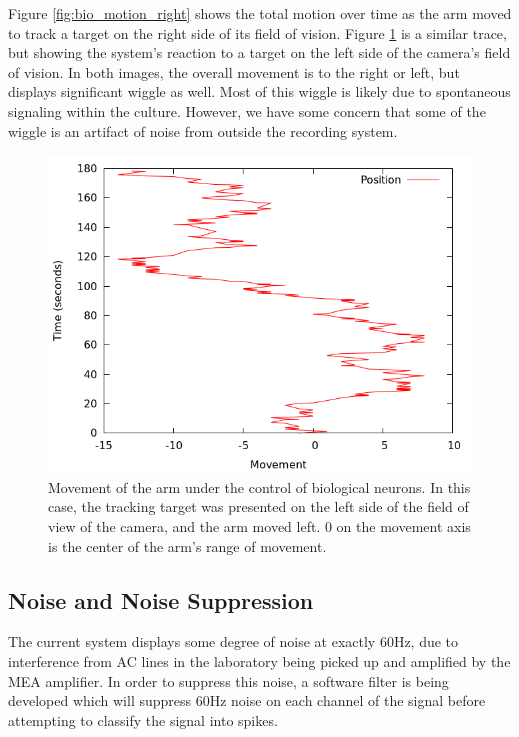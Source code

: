 \documentclass[letterpaper]{article}
\begin{document}
Figure \ref{fig:bio_motion_right} shows the total motion over time as the arm moved to track a target on the right side of its field of vision. 
Figure \ref{fig:bio_motion_left} is a similar trace, but showing the system's reaction to a target on the left side of the camera's field of vision. 
In both images, the overall movement is to the right or left, but displays significant wiggle as well.
Most of this wiggle is likely due to spontaneous signaling within the culture.
However, we have some concern that some of the wiggle is an artifact of noise from outside the recording system. 

\begin{figure}
	\centering
	\includegraphics[width=\linewidth]{bio_motion_446.png}
	\caption{Movement of the arm under the control of biological neurons. In this case, the tracking target was presented on the left side of the field of view of the camera, and the arm moved left. 0 on the movement axis is the center of the arm's range of movement.}
	\label{fig:bio_motion_left}	
\end{figure}

\subsection{Noise and Noise Suppression}

The current system displays some degree of noise at exactly 60Hz, due to interference from AC lines in the laboratory being picked up and amplified by the MEA amplifier. 
In order to suppress this noise, a software filter is being developed which will suppress 60Hz noise on each channel of the signal before attempting to classify the signal into spikes. 
\end{document}
